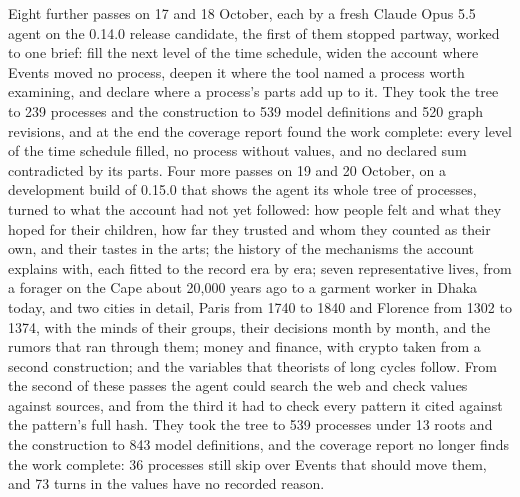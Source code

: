 \documentclass[11pt,a4paper]{article}
\begin{document}
Eight further passes on 17 and 18 October, each by a fresh Claude Opus 5.5 agent
on the 0.14.0 release candidate, the first of them stopped partway, worked to
one brief: fill the next level of the time schedule, widen the account where
Events moved no process, deepen it where the tool named a process worth
examining, and declare where a process's parts add up to it. They took the tree
to 239 processes and the construction to 539 model definitions and 520 graph
revisions, and at the end the coverage report found the work complete: every
level of the time schedule filled, no process without values, and no declared
sum contradicted by its parts. Four more passes on 19 and 20 October, on a
development build of 0.15.0 that shows the agent its whole tree of processes,
turned to what the account had not yet followed: how people felt and what they
hoped for their children, how far they trusted and whom they counted as their
own, and their tastes in the arts; the history of the mechanisms the account
explains with, each fitted to the record era by era; seven representative lives,
from a forager on the Cape about 20,000 years ago to a garment worker in Dhaka
today, and two cities in detail, Paris from 1740 to 1840 and Florence from 1302
to 1374, with the minds of their groups, their decisions month by month, and the
rumors that ran through them; money and finance, with crypto taken from a second
construction; and the variables that theorists of long cycles follow. From the
second of these passes the agent could search the web and check values against
sources, and from the third it had to check every pattern it cited against the
pattern's full hash. They took the tree to 539 processes under 13 roots and the
construction to 843 model definitions, and the coverage report no longer finds
the work complete: 36 processes still skip over Events that should move them,
and 73 turns in the values have no recorded reason.
\end{document}
